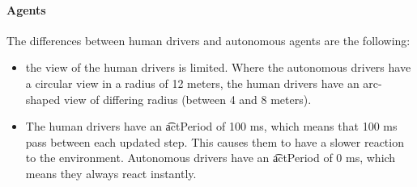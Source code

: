 

\paragraph{Agents}
The differences between human drivers and autonomous agents are the following:
\begin{itemize}
	\item the view of the human drivers is limited. Where the autonomous drivers have a circular view in a radius of 12 meters, the human drivers have an arc-shaped view of differing radius (between 4 and 8 meters).
	\item The human drivers have an \t{actPeriod} of 100 \si{\milli\second}, which means that 100 \si{\milli\second} pass between each updated step. This causes them to have a slower reaction to the environment. Autonomous drivers have an \t{actPeriod} of 0 \si{\milli\second}, which means they always react instantly. 
\end{itemize}





